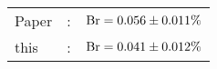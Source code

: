       \begin{tabular}{lcr}
          Paper &:& $\mathrm{Br}  = 0.056\pm 0.011\%$ \\
          this      &:& $\mathrm{Br}  = 0.041\pm 0.012\%$ \\        
      \end{tabular}
